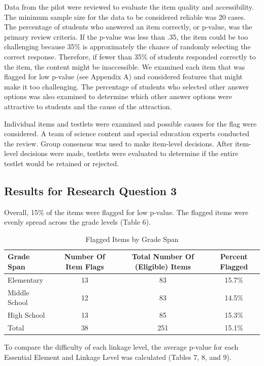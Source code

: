 \documentclass[11.5pt]{sig-alternate} %
\begin{document}
\begin{large}
Data from the pilot were reviewed to evaluate the item quality and accessibility. The minimum sample size for the data to be considered reliable was 20 cases. The percentage of students who answered an item correctly, or p-value, was the primary review criteria. If the p-value was less than .35, the item could be too challenging because 35\% is approximately the chance of randomly selecting the correct response. Therefore, if fewer than 35\% of students responded correctly to the item, the content might be inaccessible. We examined each item that was flagged for low p-value (see Appendix A) and considered features that might make it too challenging. The percentage of students who selected other answer options was also examined to determine which other answer options were attractive to students and the cause of the attraction. 

Individual items and testlets were examined and possible causes for the flag were considered. A team of science content and special education experts conducted the review. Group consensus was used to make item-level decisions. After item-level decisions were made, testlets were evaluated to determine if the entire testlet would be retained or rejected. 

\subsection*{Results for Research Question 3}

Overall, 15\% of the items were flagged for low p-value. The flagged items were evenly spread across the grade levels (Table 6). 

\begin{table}[ht]
\caption{Flagged Items by Grade Span}
\begin{tabular}{lccc}
\hline
Grade Span & Number Of Item Flags & Total Number Of (Eligible) Items & Percent Flagged \\ \hline
Elementary & 13 & 83 & 15.7\% \\
Middle School & 12 & 83 & 14.5\% \\
High School & 13 & 85 & 15.3\% \\
Total & 38 & 251 & 15.1\% \\ \hline
\end{tabular}
\end{table}

To compare the difficulty of each linkage level, the average p-value for each Essential Element and Linkage Level was calculated (Tables 7, 8, and 9). 


\end{large}
\end{document}
